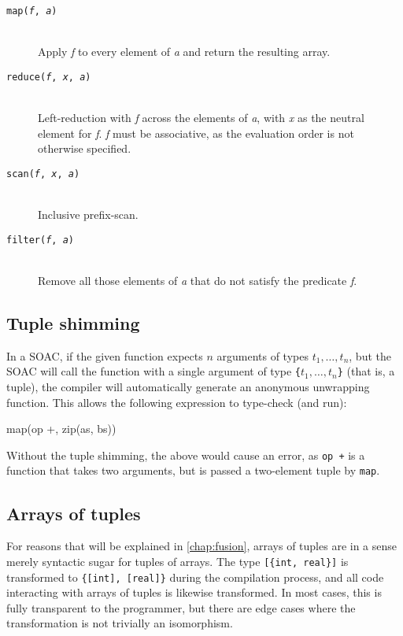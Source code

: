 \begin{description}
  \item[\texttt{map(\textit{f}, \textit{a})}]\hfill\\
    Apply \textit{f} to every element of \textit{a} and return the resulting array.

  \item[\texttt{reduce(\textit{f}, \textit{x}, \textit{a})}]\hfill\\
    Left-reduction with \textit{f} across the elements of \textit{a},
    with \textit{x} as the neutral element for \textit{f}.  \textit{f}
    must be associative, as the evaluation order is not otherwise
    specified.

  \item[\texttt{scan(\textit{f}, \textit{x}, \textit{a})}]\hfill\\
    Inclusive prefix-scan.

  \item[\texttt{filter(\textit{f}, \textit{a})}]\hfill\\
    Remove all those elements of \textit{a} that do not satisfy the
    predicate \textit{f}.

\end{description}

\subsection{Tuple shimming}

In a SOAC, if the given function expects $n$ arguments of types
$t_{1}, \ldots, t_{n}$, but the SOAC will call the function with a
single argument of type \texttt{\{$t_{1}, \ldots, t_{n}$\}} (that is,
a tuple), the \LO{} compiler will automatically generate an anonymous
unwrapping function.  This allows the following expression to
type-check (and run):

\begin{colorcode}
  map(op +, zip(as, bs))
\end{colorcode}

Without the tuple shimming, the above would cause an error, as
\texttt{op +} is a function that takes two arguments, but is passed a
two-element tuple by \texttt{map}.

\subsection{Arrays of tuples}

For reasons that will be explained in \cref{chap:fusion},
arrays of tuples are in a sense merely syntactic sugar for tuples of
arrays.  The type \texttt{[\{int, real\}]} is transformed to
\texttt{\{[int], [real]\}} during the compilation process, and all
code interacting with arrays of tuples is likewise transformed.  In
most cases, this is fully transparent to the programmer, but there are
edge cases where the transformation is not trivially an isomorphism.

